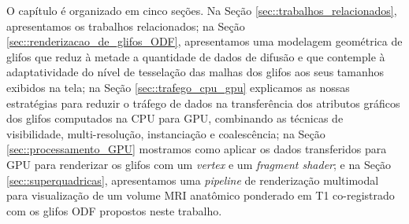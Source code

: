 O capítulo é organizado em cinco seções. Na Seção \ref{sec::trabalhos_relacionados}, apresentamos os trabalhos relacionados;  na Seção \ref{sec::renderizacao_de_glifos_ODF},  apresentamos uma modelagem geométrica de glifos que reduz à metade a quantidade de dados de difusão e que contemple à adaptatividade do nível de tesselação das malhas dos glifos aos seus tamanhos exibidos na tela; na Seção \ref{sec::trafego_cpu_gpu} explicamos as nossas estratégias para reduzir o tráfego de dados na transferência dos atributos gráficos dos glifos computados na CPU para GPU, combinando as técnicas de visibilidade, multi-resolução, instanciação e coalescência; na Seção \ref{sec::processamento_GPU}
mostramos como aplicar os dados transferidos para GPU para renderizar os glifos com um \textit{vertex} e um \textit{fragment shader}; e na Seção \ref{sec::superquadricas}, apresentamos uma \textit{pipeline} de renderização multimodal para visualização de um volume MRI anatômico ponderado em T1 co-registrado com os glifos ODF propostos neste trabalho.





